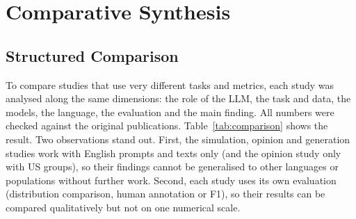 \section{Comparative Synthesis}
\label{sec:comparative_synthesis}

\subsection{Structured Comparison}
To compare studies that use very different tasks and metrics, each study was analysed along the same dimensions: the role of the LLM, the task and data, the models, the language, the evaluation and the main finding. All numbers were checked against the original publications. Table~\ref{tab:comparison} shows the result. Two observations stand out. First, the simulation, opinion and generation studies work with English prompts and texts only (and the opinion study only with US groups), so their findings cannot be generalised to other languages or populations without further work. Second, each study uses its own evaluation (distribution comparison, human annotation or F1), so their results can be compared qualitatively but not on one numerical scale. %



